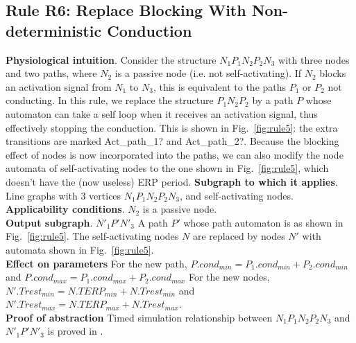 \subsection{Rule R6: Replace Blocking With Non-deterministic Conduction}
\textbf{Physiological intuition}. 
Consider the structure $N_1 P_1 N_2 P_2 N_3$ with three nodes and two paths, where $N_2$ is a passive node (i.e. not self-activating).
If $N_2$ blocks an activation signal from $N_1$ to $N_3$, this is equivalent to the paths $P_1$ or $P_2$ not conducting.
In this rule, we replace the structure $P_1 N_2 P_2$ by a path $P$ whose automaton can take a self loop when it receives an activation signal, thus effectively stopping the conduction. 
This is shown in Fig.~\ref{fig:rule5}: the extra transitions are marked {\quattrofont Act\_path\_1?} and {\quattrofont Act\_path\_2?}.
Because the blocking effect of nodes is now incorporated into the paths, we can also modify the node automata of self-activating nodes to the one shown in Fig.~\ref{fig:rule5}, which doesn't have the (now useless) ERP period.
\textbf{Subgraph to which it applies}.
Line graphs with 3 vertices $N_1 P_1 N_2 P_2 N_3$, and self-activating nodes.\\
\textbf{Applicability conditions}.
$N_2$ is a passive node.\\
\textbf{Output subgraph}.
$N'_1 P' N'_3$
A path $P'$ whose path automaton is as shown in Fig.~\ref{fig:rule5}.
The self-activating nodes $N$ are replaced by nodes $N'$ with automata shown in Fig.~\ref{fig:rule5}.\\
\textbf{Effect on parameters}
For the new path, $P.cond_{min}=P_1.cond_{min}+P_2.cond_{min}$ and 
$P.cond_{max}=P_1.cond_{max}+P_2.cond_{max}$
For the new nodes, $N'.Trest_{min}=N.TERP_{min}+N.Trest_{min}$ and 
$N'.Trest_{max}=N.TERP_{max}+N.Trest_{max}$.\\
\textbf{Proof of abstraction} Timed simulation relationship between $N_1 P_1 N_2 P_2 N_3$ and $N'_1 P' N'_3$ is proved in \cite{sttt13}.

